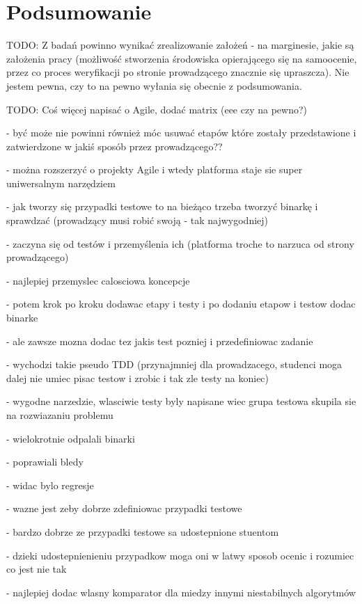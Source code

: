 \section{Podsumowanie}
\label{research_summary}

TODO:
Z badań powinno wynikać zrealizowanie założeń -
na marginesie, jakie są założenia pracy (możliwość stworzenia środowiska opierającego się na samoocenie, przez co proces weryfikacji po stronie prowadzącego znacznie się upraszcza).
Nie jestem pewna, czy to na pewno wyłania się obecnie z podsumowania.

TODO: Coś więcej napisać o Agile, dodać matrix (eee czy na pewno?)

- być może nie powinni również móc usuwać etapów które zostały przedstawione i zatwierdzone w jakiś sposób przez prowadzącego??

- można rozszerzyć o projekty Agile i wtedy platforma staje sie super uniwersalnym narzędziem

- jak tworzy się przypadki testowe to na bieżąco trzeba tworzyć binarkę i sprawdzać (prowadzący musi robić swoją - tak najwygodniej)

- zaczyna się od testów i przemyślenia ich (platforma troche to narzuca od strony prowadzącego)

- najlepiej przemyslec calosciowa koncepcje

- potem krok po kroku dodawac etapy i testy i po dodaniu etapow i testow dodac binarke

- ale zawsze mozna dodac tez jakis test pozniej i przedefiniowac zadanie

- wychodzi takie pseudo TDD (przynajmniej dla prowadzacego, studenci moga dalej nie umiec pisac testow i zrobic i tak zle testy na koniec)

- wygodne narzedzie, wlasciwie testy byly napisane wiec grupa testowa skupila sie na rozwiazaniu problemu

- wielokrotnie odpalali binarki

- poprawiali bledy

- widac bylo regresje

- wazne jest zeby dobrze zdefiniowac przypadki testowe

- bardzo dobrze ze przypadki testowe sa udostepnione stuentom

- dzieki udostepnienieniu przypadkow moga oni w latwy sposob ocenic i rozumiec co jest nie tak

- najlepiej dodac wlasny komparator dla miedzy innymi niestabilnych algorytmów

